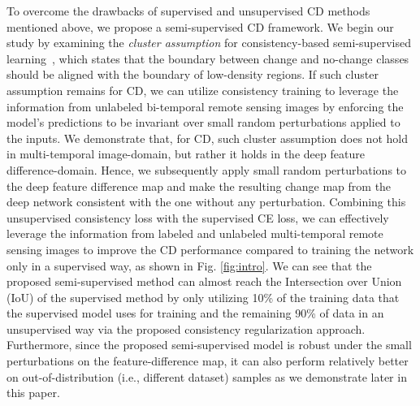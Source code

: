 \documentclass[runningheads]{llncs}
\begin{document}
To overcome the drawbacks of supervised and unsupervised CD methods mentioned above, we propose a semi-supervised CD framework. We begin our study by examining the \textit{cluster assumption} for consistency-based semi-supervised learning~\cite{chapelle2009semi}, which states that the boundary between change and no-change classes should be aligned with the boundary of low-density regions. If such cluster assumption remains for CD, we can utilize consistency training to leverage the information from unlabeled bi-temporal remote sensing images by enforcing the model’s predictions to be invariant over small random perturbations applied to the inputs. We demonstrate that, for CD, such cluster assumption does not hold in multi-temporal image-domain, but rather it holds in the deep feature difference-domain. Hence, we subsequently apply small random perturbations to the deep feature difference map and make the resulting change map from the deep network consistent with the one without any perturbation. Combining this unsupervised consistency loss with the supervised CE loss, we can effectively leverage the information from labeled and unlabeled multi-temporal remote sensing images to improve the CD performance compared to training the network only in a supervised way, as shown in Fig. \ref{fig:intro}. We can see that the proposed semi-supervised method can almost reach the Intersection over Union (IoU) of the supervised method by only utilizing 10\% of the training data that the supervised model uses for training and the remaining 90\% of data in an unsupervised way via the proposed consistency regularization approach. Furthermore, since the proposed semi-supervised model is robust under the small perturbations on the feature-difference map, it can also perform relatively better on out-of-distribution (i.e., different dataset) samples as we demonstrate later in this paper. 
\end{document}
